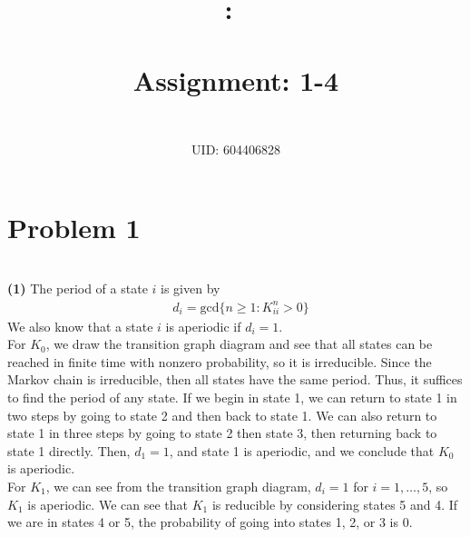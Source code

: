 \documentclass[5pt]{article}
\title{
    \textmd{\textbf{\hmwkClass:\ \hmwkTitle}}\\
    \vspace{0.1in}\large{\textit{\hmwkClassInstructor\ \hmwkClassTime} \\ Assignment: 1-4}
    \author{\textbf{\hmwkAuthorName} \\ UID: 604406828}
}
\begin{document}




\maketitle


\section{Problem 1} \\

\textbf{(1)}  The period of a state $i$ is given by
\begin{align}
	& d_i = \mathrm{gcd} \{ n \geq 1 : K_{ii}^{n} > 0 \}
\end{align}
We also know that a state $i$ is aperiodic if $d_i = 1$. \\

For $K_0$, we draw the transition graph diagram and see that all states can be reached in finite time with nonzero probability, so it is irreducible. Since the Markov chain is irreducible, then all states have the same period. Thus, it suffices to find the period of any state. If we begin in state 1, we can return to state 1 in two steps by going to state 2 and then back to state 1. We can also return to state 1 in three steps by going to state 2 then state 3, then returning back to state 1 directly. Then, $d_1 = 1$, and state 1 is aperiodic, and we conclude that $K_0$ is aperiodic. \\

For $K_1$, we can see from the transition graph diagram, $d_i = 1$ for $i = 1, \ldots, 5$, so $K_1$ is aperiodic. We can see that $K_1$ is reducible by considering states 5 and 4. If we are in states 4 or 5, the probability of going into states 1, 2, or 3 is 0. \\
\end{document}
